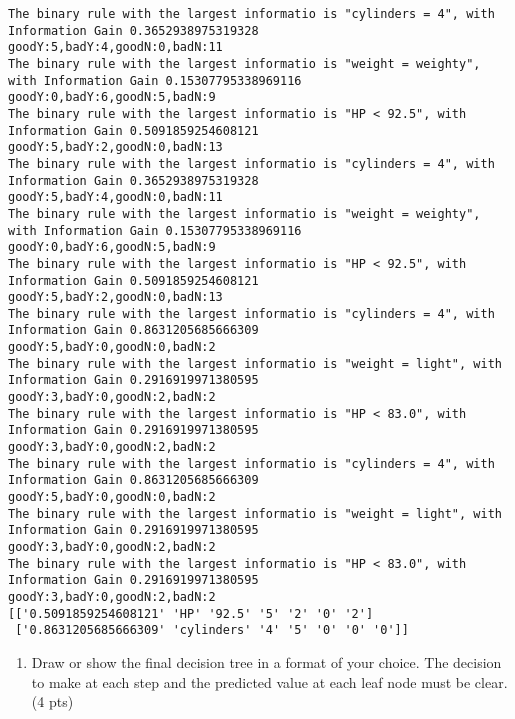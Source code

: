\documentclass[11pt]{article}
\providecommand{\tightlist}{%
      \setlength{\itemsep}{0pt}\setlength{\parskip}{0pt}}
\begin{document}
    \begin{Verbatim}[commandchars=\\\{\}]
The binary rule with the largest informatio is "cylinders = 4", with Information Gain 0.3652938975319328
goodY:5,badY:4,goodN:0,badN:11
The binary rule with the largest informatio is "weight = weighty", with Information Gain 0.15307795338969116
goodY:0,badY:6,goodN:5,badN:9
The binary rule with the largest informatio is "HP < 92.5", with Information Gain 0.5091859254608121
goodY:5,badY:2,goodN:0,badN:13
The binary rule with the largest informatio is "cylinders = 4", with Information Gain 0.3652938975319328
goodY:5,badY:4,goodN:0,badN:11
The binary rule with the largest informatio is "weight = weighty", with Information Gain 0.15307795338969116
goodY:0,badY:6,goodN:5,badN:9
The binary rule with the largest informatio is "HP < 92.5", with Information Gain 0.5091859254608121
goodY:5,badY:2,goodN:0,badN:13
The binary rule with the largest informatio is "cylinders = 4", with Information Gain 0.8631205685666309
goodY:5,badY:0,goodN:0,badN:2
The binary rule with the largest informatio is "weight = light", with Information Gain 0.2916919971380595
goodY:3,badY:0,goodN:2,badN:2
The binary rule with the largest informatio is "HP < 83.0", with Information Gain 0.2916919971380595
goodY:3,badY:0,goodN:2,badN:2
The binary rule with the largest informatio is "cylinders = 4", with Information Gain 0.8631205685666309
goodY:5,badY:0,goodN:0,badN:2
The binary rule with the largest informatio is "weight = light", with Information Gain 0.2916919971380595
goodY:3,badY:0,goodN:2,badN:2
The binary rule with the largest informatio is "HP < 83.0", with Information Gain 0.2916919971380595
goodY:3,badY:0,goodN:2,badN:2
[['0.5091859254608121' 'HP' '92.5' '5' '2' '0' '2']
 ['0.8631205685666309' 'cylinders' '4' '5' '0' '0' '0']]

    \end{Verbatim}

    \begin{enumerate}
\def\labelenumi{\alph{enumi})}
\setcounter{enumi}{5}
\tightlist
\item
  Draw or show the final decision tree in a format of your choice. The
  decision to make at each step and the predicted value at each leaf
  node must be clear. (4 pts)
\end{enumerate}
\end{document}
